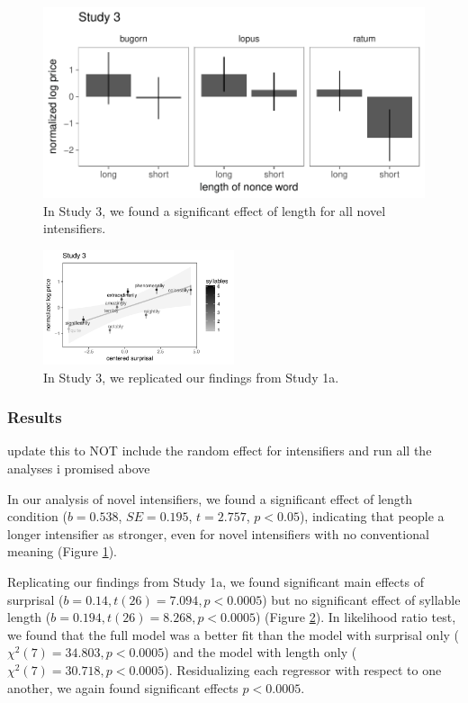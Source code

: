 \documentclass[10pt,letterpaper]{article}
\newcommand{\todo}[1]{{\color{red}#1}}
\begin{document}
\begin{figure}[hbt]
\begin{center}
\includegraphics[width=.5\textwidth]{images/plot_study3_A.pdf}
\end{center}
\caption{In Study 3, we found a significant effect of length for all novel intensifiers.} 
\label{fig:plot_study3_barplot}
\end{figure}

\begin{figure}[hbt]
\begin{center}
\includegraphics[width=0.5\textwidth]{images/plot_study3_B.pdf}
\end{center}
\caption{In Study 3, we replicated our findings from Study 1a.}
\label{fig:plot_study3_scatter}
\end{figure}

\subsubsection{Results}

\todo{update this to NOT include the random effect for intensifiers and run all the analyses i promised above}

In our analysis of novel intensifiers, we found a significant effect of length condition ($b=0.538$, $SE=0.195$, $t=2.757$, $p<0.05$), indicating that people a longer intensifier as stronger, even for novel intensifiers with no conventional meaning (Figure \ref{fig:plot_study3_barplot}).

Replicating our findings from Study 1a, we found significant main effects of surprisal ($b=0.14, t(26)=7.094, p<0.0005$) but no significant effect of syllable length ($b=0.194, t(26)=8.268, p<0.0005$) (Figure \ref{fig:plot_study3_scatter}). In likelihood ratio test, we found that the full model was a better fit than the model with surprisal only ($\chi^2(7)=34.803, p<0.0005$) and the model with length only ($\chi^2(7)=30.718, p<0.0005$). Residualizing each regressor with respect to one another, we again found significant effects $p<0.0005$.
\end{document}
